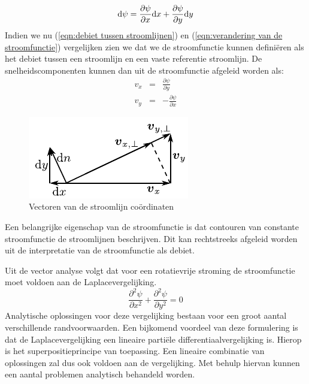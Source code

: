 \begin{equation}
	\mathrm{d} \psi = \frac{\partial \psi}{\partial x} \mathrm{d} x + \frac{\partial \psi}{\partial y} \mathrm{d} y
	\label{eqn:verandering van de stroomfunctie}
\end{equation}
Indien we nu (\ref{eqn:debiet tussen stroomlijnen}) en (\ref{eqn:verandering van de stroomfunctie}) vergelijken zien we dat we de stroomfunctie kunnen definiëren als het debiet tussen een stroomlijn en een vaste referentie stroomlijn. De snelheidscomponenten kunnen dan uit de stroomfunctie afgeleid worden als:
\begin{eqnarray}
	v_x &=&  \frac{\partial \psi}{\partial y} \\
	v_y &=& -\frac{\partial \psi}{\partial x}
\end{eqnarray}
\begin{figure}[htb]
	\centering
	\includegraphics{fig/uitwendige_stroming/Stroomlijnen}
	\caption{Vectoren van de stroomlijn coördinaten}
	\label{fig:Stroomlijn coordinaten}
\end{figure}
Een belangrijke eigenschap van de stroomfunctie is dat contouren van constante stroomfunctie de stroomlijnen beschrijven. Dit kan rechtstreeks afgeleid worden uit de interpretatie van de stroomfunctie als debiet.

Uit de vector analyse volgt dat voor een rotatievrije stroming de stroomfunctie moet voldoen aan de Laplacevergelijking.
\begin{equation}
	\frac{\partial^2 \psi}{\partial x^2} + \frac{\partial^2 \psi}{\partial y^2} = 0
	\label{eqn:laplacevergelijking}
\end{equation}
Analytische oplossingen voor deze vergelijking bestaan voor een groot aantal verschillende randvoorwaarden. Een bijkomend voordeel van deze formulering is dat de Laplacevergelijking een lineaire partiële differentiaalvergelijking is. Hierop is het superpositieprincipe van toepassing. Een lineaire combinatie van oplossingen zal dus ook voldoen aan de vergelijking. Met behulp hiervan kunnen een aantal problemen analytisch behandeld worden.


